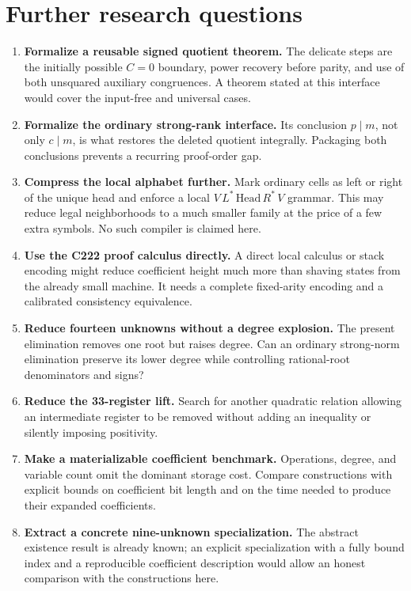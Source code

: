\documentclass[11pt,a4paper]{article}
\theoremstyle{remark}\newtheorem{remark}[theorem]{Remark}
\begin{document}
\section{Further research questions}
\begin{enumerate}
\item \textbf{Formalize a reusable signed quotient theorem.} The delicate
steps are the initially possible \(C=0\) boundary, power recovery before
parity, and use of both unsquared auxiliary congruences. A theorem stated
at this interface would cover the input-free and universal cases.
\item \textbf{Formalize the ordinary strong-rank interface.} Its conclusion
\(p\mid m\), not only \(c\mid m\), is what restores the deleted
quotient integrally. Packaging both conclusions prevents a recurring
proof-order gap.
\item \textbf{Compress the local alphabet further.} Mark ordinary cells as
left or right of the unique head and enforce a local
\(V\,L^*\,\mathrm{Head}\,R^*\,V\) grammar. This may reduce legal
neighborhoods to a much smaller family at the price of a few extra
symbols. No such compiler is claimed here.
\item \textbf{Use the C222 proof calculus directly.} A direct local
calculus or stack encoding might reduce coefficient height much more
than shaving states from the already small machine. It needs a complete
fixed-arity encoding and a calibrated consistency equivalence.
\item \textbf{Reduce fourteen unknowns without a degree explosion.} The
present elimination removes one root but raises degree. Can an ordinary
strong-norm elimination preserve its lower degree while controlling
rational-root denominators and signs?
\item \textbf{Reduce the 33-register lift.} Search for another quadratic
relation allowing an intermediate register to be removed without adding
an inequality or silently imposing positivity.
\item \textbf{Make a materializable coefficient benchmark.} Operations,
degree, and variable count omit the dominant storage cost. Compare
constructions with explicit bounds on coefficient bit length and on the
time needed to produce their expanded coefficients.
\item \textbf{Extract a concrete nine-unknown specialization.} The abstract
existence result is already known; an explicit specialization with a
fully bound index and a reproducible coefficient description would allow
an honest comparison with the constructions here.
\end{enumerate}
\end{document}
